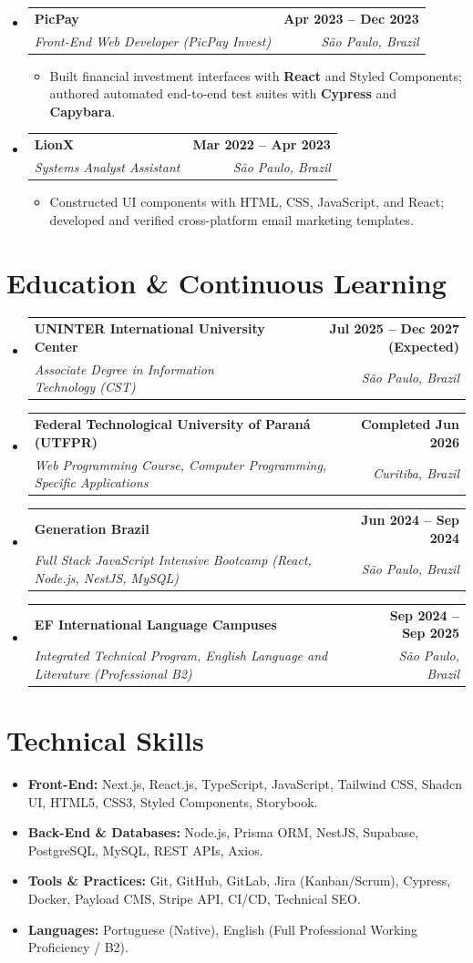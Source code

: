 \documentclass[a4paper,10pt]{article}
\makeatletter
\newcommand{\resumeItem}[1]{
  \item\small{#1}
}
\newcommand{\resumeSubheading}[4]{
  \vspace{1pt}\item[]
    \begin{tabular*}{1.0\textwidth}[t]{l@{\extracolsep{\fill}}r}
      \textbf{#1} & \textbf{\small #2} \\
      \textit{\small#3} & \textit{\small #4} \\
    \end{tabular*}\vspace{-4pt}
}
\makeatother
\begin{document}
\begin{itemize}[leftmargin=0pt, label={}]
  \resumeSubheading
    {PicPay}{Apr 2023 -- Dec 2023}
    {Front-End Web Developer (PicPay Invest)}{São Paulo, Brazil}
    \begin{itemize}[leftmargin=12pt]
      \resumeItem{Built financial investment interfaces with \textbf{React} and Styled Components; authored automated end-to-end test suites with \textbf{Cypress} and \textbf{Capybara}.}
    \end{itemize}

  \resumeSubheading
    {LionX}{Mar 2022 -- Apr 2023}
    {Systems Analyst Assistant}{São Paulo, Brazil}
    \begin{itemize}[leftmargin=12pt]
      \resumeItem{Constructed UI components with HTML, CSS, JavaScript, and React; developed and verified cross-platform email marketing templates.}
    \end{itemize}

\end{itemize}

\section{Education \& Continuous Learning}
\begin{itemize}[leftmargin=0pt, label={}]
  \resumeSubheading
    {UNINTER International University Center}{Jul 2025 -- Dec 2027 (Expected)}
    {Associate Degree in Information Technology (CST)}{São Paulo, Brazil}

  \resumeSubheading
    {Federal Technological University of Paraná (UTFPR)}{Completed Jun 2026}
    {Web Programming Course, Computer Programming, Specific Applications}{Curitiba, Brazil}

  \resumeSubheading
    {Generation Brazil}{Jun 2024 -- Sep 2024}
    {Full Stack JavaScript Intensive Bootcamp (React, Node.js, NestJS, MySQL)}{São Paulo, Brazil}

  \resumeSubheading
    {EF International Language Campuses}{Sep 2024 -- Sep 2025}
    {Integrated Technical Program, English Language and Literature (Professional B2)}{São Paulo, Brazil}
\end{itemize}

\section{Technical Skills}
\begin{itemize}[leftmargin=12pt]
  \item \textbf{Front-End:} Next.js, React.js, TypeScript, JavaScript, Tailwind CSS, Shadcn UI, HTML5, CSS3, Styled Components, Storybook.
  \item \textbf{Back-End \& Databases:} Node.js, Prisma ORM, NestJS, Supabase, PostgreSQL, MySQL, REST APIs, Axios.
  \item \textbf{Tools \& Practices:} Git, GitHub, GitLab, Jira (Kanban/Scrum), Cypress, Docker, Payload CMS, Stripe API, CI/CD, Technical SEO.
  \item \textbf{Languages:} Portuguese (Native), English (Full Professional Working Proficiency / B2).
\end{itemize}
\end{document}
